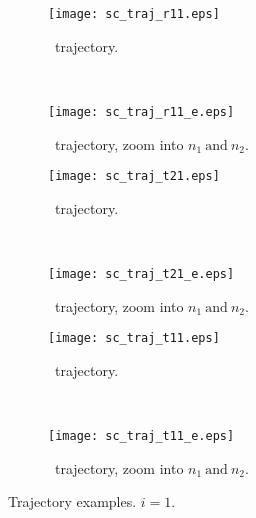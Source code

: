 \begin{figure}
\begin{subfigure}[t]{0.5\textwidth}
\centering
\texttt{[image: sc\_traj\_r11.eps]}
\caption[Single avoided crossing: \roo~trajectory.]{\roo~trajectory.}
\label{sf:scr11}
\end{subfigure}
~
\begin{subfigure}[t]{0.5\textwidth}
\centering
\texttt{[image: sc\_traj\_r11\_e.eps]}
\caption[Single avoided crossing: \roo~trajectory, zoom into $ n_{1}~\text{and}~n_{2} $.]{\roo~trajectory, zoom into $ n_{1}~\text{and}~n_{2} $.}
\label{sf:scr11e}
\end{subfigure}

\begin{subfigure}[t]{0.5\textwidth}
\centering
\texttt{[image: sc\_traj\_t21.eps]}
\caption[Single avoided crossing: \tto~trajectory.]{\tto~trajectory.}
\label{sf:sct21}
\end{subfigure}
~
\begin{subfigure}[t]{0.5\textwidth}
\centering
\texttt{[image: sc\_traj\_t21\_e.eps]}
\caption[Single avoided crossing: \tto~trajectory, zoom into $ n_{1}~\text{and}~n_{2} $.]{\tto~trajectory, zoom into $ n_{1}~\text{and}~n_{2} $.}
\label{sf:sct21e}
\end{subfigure}

\begin{subfigure}[t]{0.5\textwidth}
\centering
\texttt{[image: sc\_traj\_t11.eps]}
\caption[Single avoided crossing: \too~trajectory.]{\too~trajectory.}
\label{sf:sct11}
\end{subfigure}
~
\begin{subfigure}[t]{0.5\textwidth}
\centering
\texttt{[image: sc\_traj\_t11\_e.eps]}
\caption[Single avoided crossing: \too~trajectory, zoom into $ n_{1}~\text{and}~n_{2} $.]{\too~trajectory, zoom into $ n_{1}~\text{and}~n_{2} $.}
\label{sf:sct11e}
\end{subfigure}
\caption[Single avoided crossing: trajectory examples. $ i = 1 $.]{Trajectory examples.  $ i = 1 $.}
\label{f:sc1t}
\end{figure}

